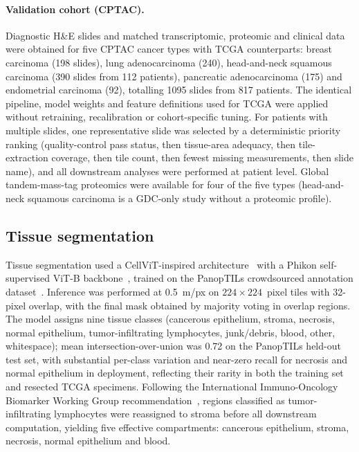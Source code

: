 \paragraph{Validation cohort (CPTAC).}
Diagnostic H\&E slides and matched transcriptomic, proteomic and clinical data
were obtained for five CPTAC cancer types with TCGA counterparts: breast
carcinoma (198 slides), lung adenocarcinoma (240), head-and-neck squamous
carcinoma (390 slides from 112 patients), pancreatic adenocarcinoma (175) and
endometrial carcinoma (92), totalling \num{1095} slides from 817 patients. The
identical pipeline, model weights and feature definitions used for TCGA were
applied without retraining, recalibration or cohort-specific tuning. For patients
with multiple slides, one representative slide was selected by a deterministic
priority ranking (quality-control pass status, then tissue-area adequacy, then
tile-extraction coverage, then tile count, then fewest missing measurements, then
slide name), and all downstream analyses were performed at patient level.
Global tandem-mass-tag proteomics were available for four of the five types
(head-and-neck squamous carcinoma is a GDC-only study without a proteomic
profile).

\subsection{Tissue segmentation}
\label{sec:methods:tissue}

Tissue segmentation used a CellViT-inspired architecture~\cite{hoerst2024cellvit}
with a Phikon self-supervised ViT-B backbone~\cite{filiot2023phikon}, trained on
the PanopTILs crowdsourced annotation dataset~\cite{liu2024panoptils}. Inference was performed at
0.5~\textmu m/px on $224 \times 224$~pixel tiles with 32-pixel overlap, with the
final mask obtained by majority voting in overlap regions. The model assigns nine
tissue classes (cancerous epithelium, stroma, necrosis, normal epithelium,
tumor-infiltrating lymphocytes, junk/debris, blood, other, whitespace); mean
intersection-over-union was 0.72 on the PanopTILs held-out test set, with
substantial per-class variation and near-zero recall for necrosis and normal
epithelium in deployment, reflecting their rarity in both the training set and
resected TCGA specimens. Following the International Immuno-Oncology Biomarker
Working Group recommendation~\cite{salgado2015til}, regions classified as
tumor-infiltrating lymphocytes were reassigned to stroma before all downstream
computation, yielding five effective compartments: cancerous epithelium, stroma,
necrosis, normal epithelium and blood.

